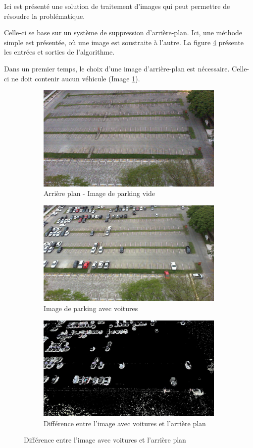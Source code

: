 Ici est présenté une solution de traitement d'images qui peut permettre de résoudre la problématique. 

Celle-ci se base sur un système de suppression d'arrière-plan. Ici, une méthode simple est présentée, où une image est soustraite à l'autre. La figure \ref{fig:background_suppression} présente les entrées et sorties de l'algorithme.

Dans un premier temps, le choix d'une image d'arrière-plan est nécessaire. Celle-ci ne doit contenir aucun véhicule (Image \ref{fig:back_a}). 

\begin{figure}[H]
    \begin{subfigure}{\textwidth}
        \centering
        \includegraphics[width=.5\linewidth]{img/conception/park_empty.jpg}
        \caption{Arrière plan - Image de parking vide}
        \label{fig:back_a}
    \end{subfigure}%

    \bigskip
    \begin{subfigure}{\textwidth}
        \centering
        \includegraphics[width=.5\linewidth]{img/conception/park_cars.jpg}
        \caption{Image de parking avec voitures}
        \label{fig:back_b}
    \end{subfigure}%
    
    \bigskip
    \begin{subfigure}{\textwidth}
        \centering
        \includegraphics[width=.5\linewidth]{img/conception/park_sub.jpg}
        \caption{Différence entre l'image avec voitures et l'arrière plan}
        \label{fig:back_c}
    \end{subfigure}%

    \centering
    \label{fig:background_suppression}
\end{figure}

